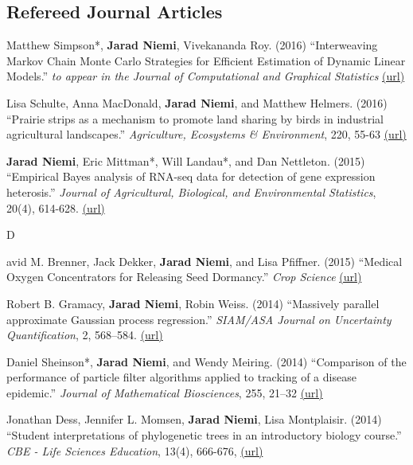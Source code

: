 \documentclass[overlapped,line]{res}
\begin{document}
\begin{resume}
\subsection{\bf Refereed Journal Articles}

\vspace{-0.2in}

Matthew Simpson*, {\bf Jarad Niemi}, Vivekananda Roy. (2016) ``Interweaving Markov Chain Monte Carlo Strategies for Efficient Estimation of Dynamic Linear Models.'' \emph{to appear in the Journal of Computational and Graphical Statistics} \href{http://www.tandfonline.com/doi/abs/10.1080/10618600.2015.1105748}{(url)}

Lisa Schulte, Anna MacDonald, {\bf Jarad Niemi}, and Matthew Helmers. (2016) ``Prairie strips as a mechanism to promote land sharing by birds in industrial agricultural landscapes.'' \emph{Agriculture, Ecosystems \& Environment}, 220, 55-63 \href{http://www.sciencedirect.com/science/article/pii/S016788091630007X}{(url)}

{\bf Jarad Niemi}, Eric Mittman*, Will Landau*, and Dan Nettleton. (2015) ``Empirical Bayes analysis of RNA-seq data for detection of gene expression heterosis.'' \emph{Journal of Agricultural, Biological, and Environmental Statistics}, 20(4), 614-628. \href{http://link.springer.com/article/10.1007%2Fs13253-015-0230-5}{(url)}



\newpage \opening

David M. Brenner, Jack Dekker, {\bf Jarad Niemi}, and Lisa Pfiffner. (2015) ``Medical Oxygen Concentrators for Releasing Seed Dormancy.'' \emph{Crop Science} \href{https://dl.sciencesocieties.org/publications/cs/pdfs/0/0/cropsci2014.11.0783}{(url)}

Robert B. Gramacy, {\bf Jarad Niemi}, Robin Weiss. (2014) ``Massively parallel approximate Gaussian process regression.'' \emph{SIAM/ASA Journal on Uncertainty Quantification}, 2, 568--584. \href{http://epubs.siam.org/doi/abs/10.1137/130941912}{(url)}

Daniel Sheinson*, {\bf Jarad Niemi}, and Wendy Meiring. (2014) ``Comparison of the performance of particle filter algorithms applied to tracking of a disease epidemic.'' \emph{Journal of Mathematical Biosciences}, 255, 21--32 \href{http://www.sciencedirect.com/science/article/pii/S0025556414001242}{(url)}

Jonathan Dess, Jennifer L. Momsen, {\bf Jarad Niemi}, Lisa Montplaisir. (2014) ``Student interpretations of phylogenetic trees in an introductory biology course.'' \emph{CBE - Life Sciences Education}, 13(4), 666-676, \href{http://www.lifescied.org/content/13/4/666.full?sid=7d54efe2-73cc-4823-b359-0ec4066c4e5b}{(url)}


\end{resume}
\end{document}
